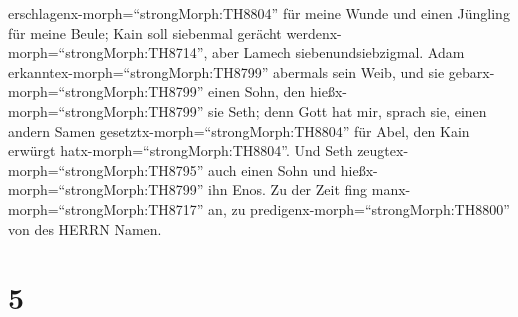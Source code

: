 erschlagenx-morph=``strongMorph:TH8804'' für meine Wunde und einen
Jüngling für meine Beule;  Kain soll siebenmal gerächt
werdenx-morph=``strongMorph:TH8714'', aber Lamech siebenundsiebzigmal.
 Adam erkanntex-morph=``strongMorph:TH8799'' abermals sein
Weib, und sie gebarx-morph=``strongMorph:TH8799'' einen Sohn, den
hießx-morph=``strongMorph:TH8799'' sie Seth; denn Gott hat mir, sprach
sie, einen andern Samen gesetztx-morph=``strongMorph:TH8804'' für Abel,
den Kain erwürgt hatx-morph=``strongMorph:TH8804''.  Und
Seth zeugtex-morph=``strongMorph:TH8795'' auch einen Sohn und
hießx-morph=``strongMorph:TH8799'' ihn Enos. Zu der Zeit fing
manx-morph=``strongMorph:TH8717'' an, zu
predigenx-morph=``strongMorph:TH8800'' von des HERRN Namen.

\hypertarget{section-4}{%
\section{5}\label{section-4}}

